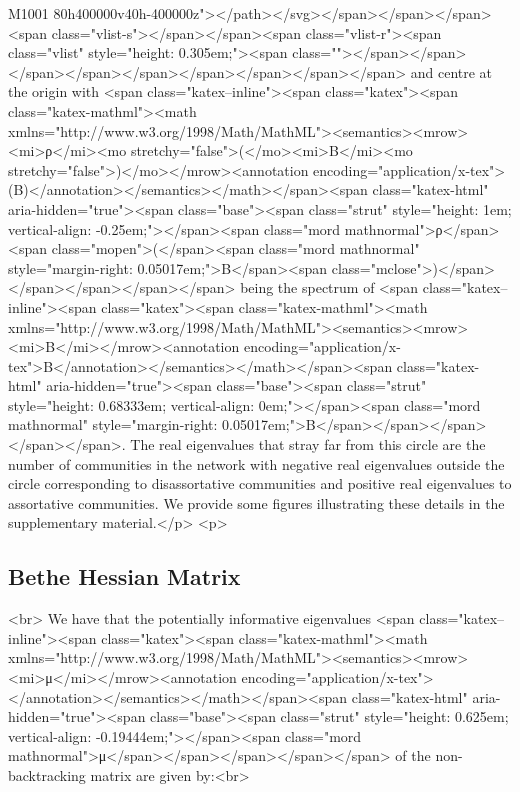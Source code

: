 M1001 80h400000v40h-400000z"></path></svg></span></span></span><span class="vlist-s">​</span></span><span class="vlist-r"><span class="vlist" style="height: 0.305em;"><span class=""></span></span></span></span></span></span></span></span></span> and centre at the origin with <span class="katex--inline"><span class="katex"><span class="katex-mathml"><math xmlns="http://www.w3.org/1998/Math/MathML"><semantics><mrow><mi>ρ</mi><mo stretchy="false">(</mo><mi>B</mi><mo stretchy="false">)</mo></mrow><annotation encoding="application/x-tex">\rho(B)</annotation></semantics></math></span><span class="katex-html" aria-hidden="true"><span class="base"><span class="strut" style="height: 1em; vertical-align: -0.25em;"></span><span class="mord mathnormal">ρ</span><span class="mopen">(</span><span class="mord mathnormal" style="margin-right: 0.05017em;">B</span><span class="mclose">)</span></span></span></span></span> being the spectrum of <span class="katex--inline"><span class="katex"><span class="katex-mathml"><math xmlns="http://www.w3.org/1998/Math/MathML"><semantics><mrow><mi>B</mi></mrow><annotation encoding="application/x-tex">B</annotation></semantics></math></span><span class="katex-html" aria-hidden="true"><span class="base"><span class="strut" style="height: 0.68333em; vertical-align: 0em;"></span><span class="mord mathnormal" style="margin-right: 0.05017em;">B</span></span></span></span></span>. The real eigenvalues that stray far from this circle are the number of communities in the network with negative real eigenvalues outside the circle corresponding to disassortative communities and positive real eigenvalues to assortative communities. We provide some figures illustrating these details in the supplementary material.</p>
<p>\subsection{Bethe Hessian Matrix}<br>
We have that the potentially informative eigenvalues <span class="katex--inline"><span class="katex"><span class="katex-mathml"><math xmlns="http://www.w3.org/1998/Math/MathML"><semantics><mrow><mi>μ</mi></mrow><annotation encoding="application/x-tex">\mu</annotation></semantics></math></span><span class="katex-html" aria-hidden="true"><span class="base"><span class="strut" style="height: 0.625em; vertical-align: -0.19444em;"></span><span class="mord mathnormal">μ</span></span></span></span></span> of the non-backtracking matrix are given by:<br>
